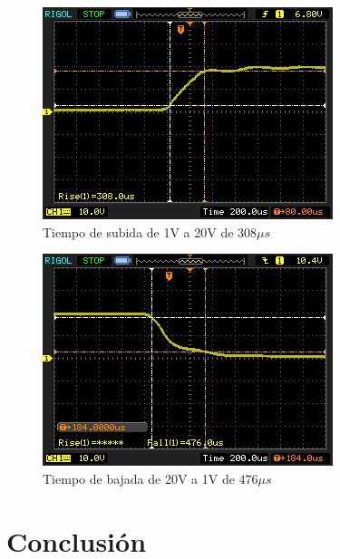 \documentclass[12pt]{report}
\begin{document}
\begin{figure}[H]
	\centering
	\includegraphics[width=\textwidth,height=0.4\textheight,keepaspectratio]{rise-time}
	\caption{Tiempo de subida de 1V a 20V de 308$\mu s$}
\end{figure}

\begin{figure}[H]
	\centering
	\includegraphics[width=\textwidth,height=0.4\textheight,keepaspectratio]{fall-time}
	\caption{Tiempo de bajada de 20V a 1V de $476\mu s$}
\end{figure}

\chapter{Conclusión}
\end{document}
